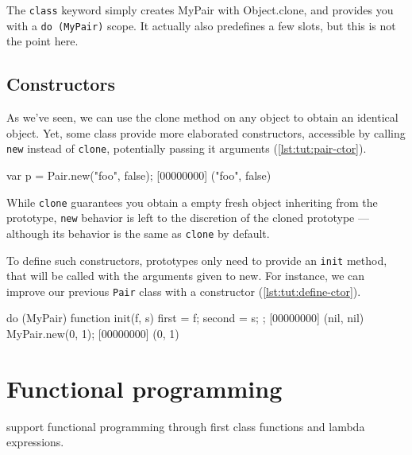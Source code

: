The \lstinline{class} keyword simply creates MyPair with Object.clone,
and provides you with a \lstinline|do (MyPair)| scope. It actually also
predefines a few slots, but this is not the point here.

\section{Constructors}
\label{sec:tut:ctor}
As we've seen, we can use the clone method on any object to obtain an
identical object. Yet, some class provide more elaborated
constructors, accessible by calling \lstinline{new} instead of
\lstinline{clone}, potentially passing it arguments (\autoref{lst:tut:pair-ctor}).

\begin{urbiscript}[caption=Calling constructors with \lstinline{new},
label=lst:tut:pair-ctor]
var p = Pair.new("foo", false);
[00000000] ("foo", false)
\end{urbiscript}

While \lstinline{clone} guarantees you obtain a empty fresh object
inheriting from the prototype, \lstinline{new} behavior is left to the
discretion of the cloned prototype --- although its behavior is the
same as \lstinline{clone} by default.

To define such constructors, prototypes only need to provide an
\lstinline{init} method, that will be called with the arguments given to
new. For instance, we can improve our previous \lstinline{Pair} class
with a constructor (\autoref{lst:tut:define-ctor}).

\begin{urbiscript}[caption=Defining constructors,
  label=lst:tut:define-ctor, name=my-pair]
do (MyPair)
{
  function init(f, s)
  {
    first = f;
    second = s;
  }
};
[00000000] (nil, nil)
MyPair.new(0, 1);
[00000000] (0, 1)
\end{urbiscript}


\chapter{Functional programming}
\label{section:functional}

\us support functional programming through first class functions and
lambda expressions.

